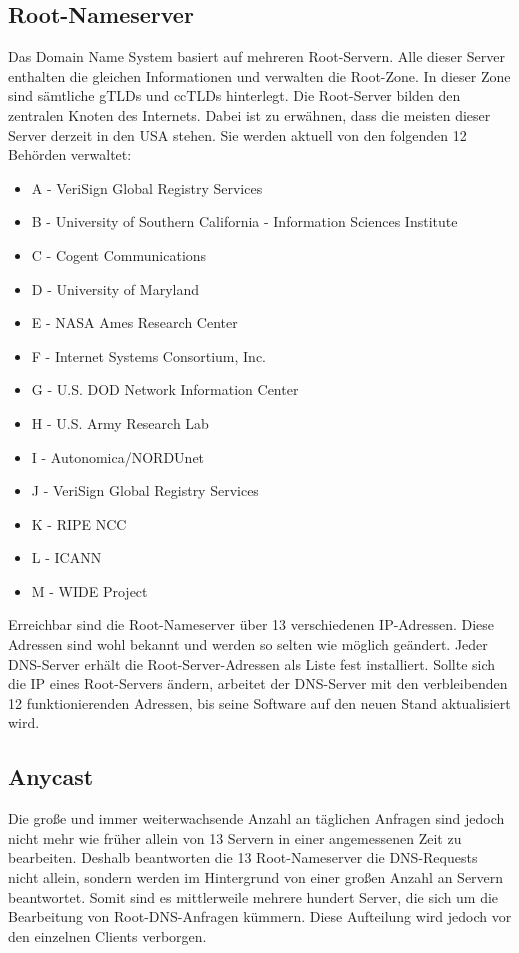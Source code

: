 \subsection{Root-Nameserver}
Das Domain Name System basiert auf mehreren Root-Servern. Alle dieser Server enthalten die gleichen Informationen und verwalten die Root-Zone. In dieser Zone sind sämtliche gTLDs und ccTLDs hinterlegt. Die Root-Server bilden den zentralen Knoten des Internets. Dabei ist zu erwähnen, dass die meisten dieser Server derzeit in den USA stehen. Sie werden aktuell von den folgenden 12 Behörden verwaltet:
\begin{itemize}
    \item A - VeriSign Global Registry Services
    \item B - University of Southern California - Information Sciences Institute
    \item C - Cogent Communications
    \item D - University of Maryland
    \item E - NASA Ames Research Center
    \item F - Internet Systems Consortium, Inc.
    \item G - U.S. DOD Network Information Center
    \item H - U.S. Army Research Lab
    \item I - Autonomica/NORDUnet
    \item J - VeriSign Global Registry Services
    \item K - RIPE NCC
    \item L - ICANN
    \item M - WIDE Project
\end{itemize}

Erreichbar sind die Root-Nameserver über 13 verschiedenen IP-Adressen. Diese Adressen sind wohl bekannt und werden so selten wie möglich geändert. Jeder DNS-Server erhält die Root-Server-Adressen als Liste fest installiert. Sollte sich die IP eines Root-Servers ändern, arbeitet der DNS-Server mit den verbleibenden 12 funktionierenden Adressen, bis seine Software auf den neuen Stand aktualisiert wird. \cite{NETNOD.2018}

\subsection{Anycast}
Die große und immer weiterwachsende Anzahl an täglichen Anfragen sind jedoch nicht mehr wie früher allein von 13 Servern in einer angemessenen Zeit zu bearbeiten. Deshalb beantworten die 13 Root-Nameserver die DNS-Requests nicht allein, sondern werden im Hintergrund von einer großen Anzahl an Servern beantwortet. Somit sind es mittlerweile mehrere hundert Server, die sich um die Bearbeitung von Root-DNS-Anfragen kümmern. Diese Aufteilung wird jedoch vor den einzelnen Clients verborgen.

